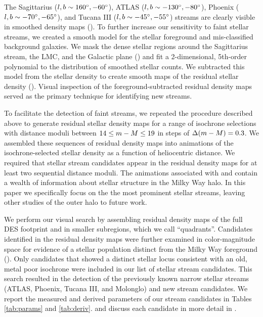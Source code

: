 \documentclass[twocolumn]{aastex61}
\begin{document}
The Sagittarius ($l,b \sim 160{}^{\circ}, -60{}^{\circ}$), ATLAS ($l,b \sim -130{}^{\circ},-80{}^{\circ}$), Phoenix ($l,b \sim -70{}^{\circ},-65{}^{\circ}$), and Tucana III ($l,b \sim -45{}^{\circ},-55{}^{\circ}$) streams are clearly visible in smoothed density maps ().
To further increase our sensitivity to faint stellar streams, we created a smooth model for the stellar foreground and mis-classified background galaxies.
We mask the dense stellar regions around the Sagittarius stream, the LMC, and the Galactic plane () and fit a 2-dimensional, 5th-order polynomial to the distribution of smoothed stellar counts.
We subtracted this model from the stellar density to create smooth maps of the residual stellar density ().
Visual inspection of the foreground-subtracted residual density maps served as the primary technique for identifying new streams.

To facilitate the detection of faint streams, we repeated the procedure described above to generate residual stellar density maps for a range of isochrone selections with distance moduli between $14 \leq m - M \leq 19$ in steps of $\Delta (m - M) = 0.3$. 
We assembled these sequences of residual density maps into animations of the isochrone-selected stellar density as a function of heliocentric distance.
We required that stellar stream candidates appear in the residual density maps for at least two sequential distance moduli.
The animations associated with  and  contain a wealth of information about stellar structure in the Milky Way halo. 
In this paper we specifically focus on the the most prominent stellar streams, leaving other studies of the outer halo to future work.

We perform our visual search by assembling residual density maps of the full DES footprint and in smaller subregions, which we call ``quadrants''.
Candidates identified in the residual density maps were further examined in color-magnitude space for evidence of a stellar population distinct from the Milky Way foreground ().
Only candidates that showed a distinct stellar locus consistent with an old, metal poor isochrone were included in our list of stellar stream candidates.
This search resulted in the detection of the \NKNOWN previously known narrow stellar streams (ATLAS, Phoenix, Tucana III, and Molonglo) and \NSTREAMS new stream candidates.
We report the measured and derived parameters of our stream candidates in Tables \ref{tab:params} and \ref{tab:deriv}.
and discuss each candidate in more detail in . 
\end{document}
